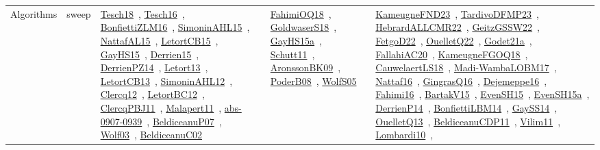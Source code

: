 {\begin{longtable}{lp{3cm}>{\raggedright\arraybackslash}p{6cm}>{\raggedright\arraybackslash}p{6cm}>{\raggedright\arraybackslash}p{8cm}}
Algorithms & sweep & \href{works/Tesch18.pdf}{Tesch18}~\cite{Tesch18}, \href{works/Tesch16.pdf}{Tesch16}~\cite{Tesch16}, \href{works/BonfiettiZLM16.pdf}{BonfiettiZLM16}~\cite{BonfiettiZLM16}, \href{works/SimoninAHL15.pdf}{SimoninAHL15}~\cite{SimoninAHL15}, \href{works/NattafAL15.pdf}{NattafAL15}~\cite{NattafAL15}, \href{works/LetortCB15.pdf}{LetortCB15}~\cite{LetortCB15}, \href{works/GayHS15.pdf}{GayHS15}~\cite{GayHS15}, \href{works/Derrien15.pdf}{Derrien15}~\cite{Derrien15}, \href{works/DerrienPZ14.pdf}{DerrienPZ14}~\cite{DerrienPZ14}, \href{works/Letort13.pdf}{Letort13}~\cite{Letort13}, \href{works/LetortCB13.pdf}{LetortCB13}~\cite{LetortCB13}, \href{works/SimoninAHL12.pdf}{SimoninAHL12}~\cite{SimoninAHL12}, \href{works/Clercq12.pdf}{Clercq12}~\cite{Clercq12}, \href{works/LetortBC12.pdf}{LetortBC12}~\cite{LetortBC12}, \href{works/ClercqPBJ11.pdf}{ClercqPBJ11}~\cite{ClercqPBJ11}, \href{works/Malapert11.pdf}{Malapert11}~\cite{Malapert11}, \href{works/abs-0907-0939.pdf}{abs-0907-0939}~\cite{abs-0907-0939}, \href{works/BeldiceanuP07.pdf}{BeldiceanuP07}~\cite{BeldiceanuP07}, \href{works/Wolf03.pdf}{Wolf03}~\cite{Wolf03}, \href{works/BeldiceanuC02.pdf}{BeldiceanuC02}~\cite{BeldiceanuC02} & \href{works/FahimiOQ18.pdf}{FahimiOQ18}~\cite{FahimiOQ18}, \href{works/GoldwaserS18.pdf}{GoldwaserS18}~\cite{GoldwaserS18}, \href{works/GayHS15a.pdf}{GayHS15a}~\cite{GayHS15a}, \href{works/Schutt11.pdf}{Schutt11}~\cite{Schutt11}, \href{works/AronssonBK09.pdf}{AronssonBK09}~\cite{AronssonBK09}, \href{works/PoderB08.pdf}{PoderB08}~\cite{PoderB08}, \href{works/WolfS05.pdf}{WolfS05}~\cite{WolfS05} & \href{works/KameugneFND23.pdf}{KameugneFND23}~\cite{KameugneFND23}, \href{works/TardivoDFMP23.pdf}{TardivoDFMP23}~\cite{TardivoDFMP23}, \href{works/HebrardALLCMR22.pdf}{HebrardALLCMR22}~\cite{HebrardALLCMR22}, \href{works/GeitzGSSW22.pdf}{GeitzGSSW22}~\cite{GeitzGSSW22}, \href{works/FetgoD22.pdf}{FetgoD22}~\cite{FetgoD22}, \href{works/OuelletQ22.pdf}{OuelletQ22}~\cite{OuelletQ22}, \href{works/Godet21a.pdf}{Godet21a}~\cite{Godet21a}, \href{works/FallahiAC20.pdf}{FallahiAC20}~\cite{FallahiAC20}, \href{works/KameugneFGOQ18.pdf}{KameugneFGOQ18}~\cite{KameugneFGOQ18}, \href{works/CauwelaertLS18.pdf}{CauwelaertLS18}~\cite{CauwelaertLS18}, \href{works/Madi-WambaLOBM17.pdf}{Madi-WambaLOBM17}~\cite{Madi-WambaLOBM17}, \href{works/Nattaf16.pdf}{Nattaf16}~\cite{Nattaf16}, \href{works/GingrasQ16.pdf}{GingrasQ16}~\cite{GingrasQ16}, \href{works/Dejemeppe16.pdf}{Dejemeppe16}~\cite{Dejemeppe16}, \href{works/Fahimi16.pdf}{Fahimi16}~\cite{Fahimi16}, \href{works/BartakV15.pdf}{BartakV15}~\cite{BartakV15}, \href{works/EvenSH15.pdf}{EvenSH15}~\cite{EvenSH15}, \href{works/EvenSH15a.pdf}{EvenSH15a}~\cite{EvenSH15a}, \href{works/DerrienP14.pdf}{DerrienP14}~\cite{DerrienP14}, \href{works/BonfiettiLBM14.pdf}{BonfiettiLBM14}~\cite{BonfiettiLBM14}, \href{works/GaySS14.pdf}{GaySS14}~\cite{GaySS14}, \href{works/OuelletQ13.pdf}{OuelletQ13}~\cite{OuelletQ13}, \href{works/BeldiceanuCDP11.pdf}{BeldiceanuCDP11}~\cite{BeldiceanuCDP11}, \href{works/Vilim11.pdf}{Vilim11}~\cite{Vilim11}, \href{works/Lombardi10.pdf}{Lombardi10}~\cite{Lombardi10}, 
\end{longtable}}

